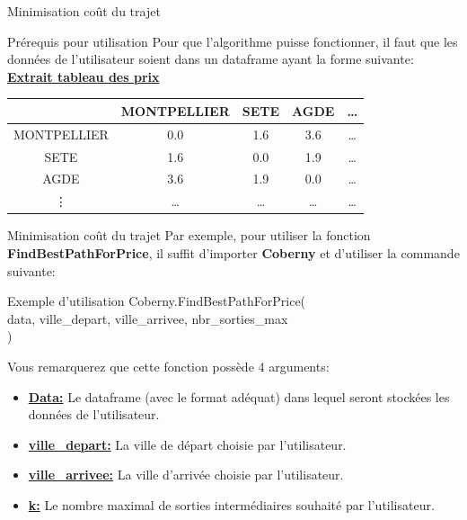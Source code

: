 \documentclass{beamer}
\begin{document}
	\begin{frame}{Minimisation coût du trajet}
		\begin{block}{Prérequis pour utilisation}
			Pour que l'algorithme puisse fonctionner, il faut que les données de l'utilisateur soient dans un dataframe ayant la forme suivante:
			\textbf{\underline{Extrait tableau des prix}}
			\begin{center}
				\begin{tabular}{|*{5}{c|}}
					\hline
					&MONTPELLIER&SETE&AGDE& \dots \\
					\hline
					MONTPELLIER&0.0&1.6&3.6& \dots \\
					\hline
					SETE&1.6&0.0&1.9& \dots \\
					\hline
					AGDE&3.6&1.9&0.0& \dots \\
					\hline
					\vdots& \dots& \dots& \dots& \dots \\
					\hline
				\end{tabular}
			\end{center}
		\end{block}
	\end{frame}

	\begin{frame}{Minimisation coût du trajet}
		Par exemple, pour utiliser la fonction \textbf{FindBestPathForPrice}, il suffit d'importer \textbf{Coberny} et d'utiliser la commande suivante:
		\begin{block}{Exemple d'utilisation}
			Coberny.FindBestPathForPrice( \\
			data, ville\_depart, ville\_arrivee, nbr\_sorties\_max \\
			)
		\end{block}
		Vous remarquerez que cette fonction possède 4 arguments:
		\begin{itemize}
			\item \underline{\textbf{Data:}} Le dataframe (avec le format adéquat) dans lequel seront stockées les données de l'utilisateur.
			\item \underline{\textbf{ville\_depart:}} La ville de départ choisie par l'utilisateur.
			\item \underline{\textbf{ville\_arrivee:}} La ville d'arrivée choisie par l'utilisateur.
			\item \underline{\textbf{k:}} Le nombre maximal de sorties intermédiaires souhaité par l'utilisateur.
		\end{itemize}
	\end{frame}
\end{document}
